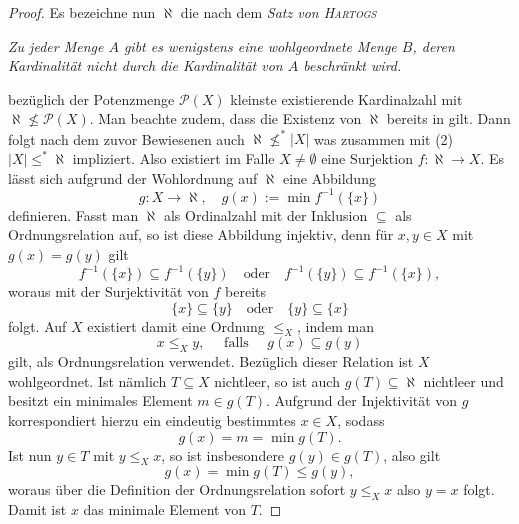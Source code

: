 \begin{proof}
  Es bezeichne nun $\aleph$ die nach dem \textit{Satz von \textsc{Hartogs} }
  \begin{addmargin}[2em]{2em}%
    \textit{Zu jeder Menge $A$ gibt es wenigstens eine wohlgeordnete Menge $B$, deren Kardinalität nicht durch die Kardinalität von $A$ beschränkt wird.} 
  \end{addmargin}
  bezüglich der Potenzmenge $\mathcal{P}(X)$ kleinste existierende Kardinalzahl mit $\aleph \not\leq \mathcal{P}(X)$.
  Man beachte zudem, dass die Existenz von $\aleph$ bereits in \ZF gilt.
  Dann folgt nach dem zuvor Bewiesenen auch $\aleph \not\leq^* |X|$ was zusammen mit (2) $|X|\leq^* \aleph$ impliziert.
  Also existiert im Falle $X \neq \emptyset$ eine Surjektion $f \colon \aleph \to X$.
  Es lässt sich aufgrund der Wohlordnung auf $\aleph$ eine Abbildung
  \begin{displaymath}
    g \colon X \to \aleph, \quad g(x) := \min f^{-1}(\{x\})
  \end{displaymath}
  definieren.
  Fasst man $\aleph$ als Ordinalzahl mit der Inklusion $\subseteq$ als Ordnungsrelation auf, so ist diese Abbildung injektiv, denn für $x,y \in X$ mit $g(x) = g(y)$ gilt
  \begin{displaymath}
    f^{-1}(\{x\}) \subseteq f^{-1}(\{y\}) \quad\text{oder}\quad f^{-1}(\{y\}) \subseteq f^{-1}(\{x\}),
  \end{displaymath}
  woraus mit der Surjektivität von $f$ bereits
  \begin{displaymath}
    \{x\} \subseteq \{y\} \quad\text{oder}\quad \{y\} \subseteq \{x\}
  \end{displaymath}
  folgt.
  Auf $X$ existiert damit eine Ordnung $\leq_X$, indem man 
  \begin{displaymath}
    x \leq_X y, \quad\text{ falls }\quad g(x) \subseteq g(y)
  \end{displaymath}
  gilt, als Ordnungsrelation verwendet. 
  Bezüglich dieser Relation ist $X$ wohlgeordnet.
  Ist nämlich $T \subseteq X$ nichtleer, so ist auch $g(T) \subseteq \aleph$ nichtleer und besitzt ein minimales Element $m \in g(T)$. Aufgrund der Injektivität von $g$ korrespondiert hierzu ein eindeutig bestimmtes $x \in X$, sodass 
  \begin{displaymath}
    g(x) = m = \min g(T).
  \end{displaymath}
  Ist nun $y \in T$ mit $y \leq_X x$, so ist insbesondere $g(y) \in g(T)$, also gilt 
  \begin{displaymath}
    g(x) = \min g(T) \leq g(y),
  \end{displaymath}
  woraus über die Definition der Ordnungsrelation sofort $y \leq_X x$ also $y = x$ folgt.
  Damit ist $x$ das minimale Element von $T$.


\end{proof}
